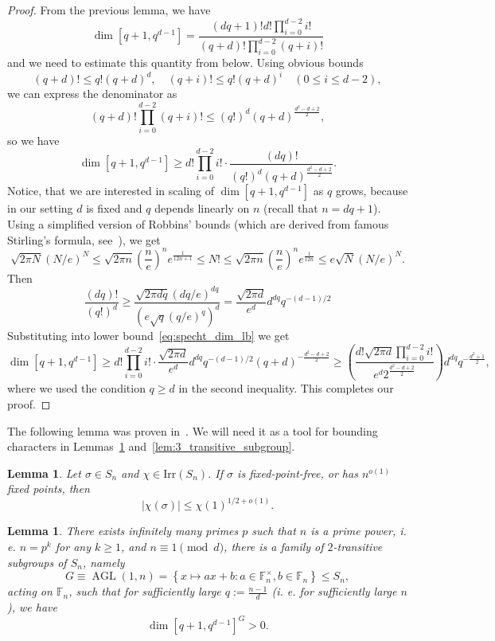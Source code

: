 \documentclass[11pt,letterpaper]{article}
\theoremstyle{plain}
\theoremstyle{plain}
\theoremstyle{plain}
\theoremstyle{plain}
\theoremstyle{plain}
\theoremstyle{plain}
\theoremstyle{plain}
\newtheorem{smlemma}[smtheorem]{Lemma}
\theoremstyle{definition}
\theoremstyle{plain}
\begin{document}
\begin{proof}
    From the previous lemma, we have
\[
    \operatorname{dim} [q+1, q^{d-1}]=\frac{(d q+1)!d!\prod_{i=0}^{d-2} i!}{(q+d)!\prod_{i=0}^{d-2}(q+i)!}
\]
and we need to estimate this quantity from below. Using obvious bounds
\[
    (q+d)!\leq q!(q+d)^d, \quad(q+i)!\leq q!(q+d)^i \quad(0 \leq i \leq d-2),
\]
we can express the denominator as
\[
    (q+d)!\prod_{i=0}^{d-2}(q+i)!\leq(q!)^d(q+d)^{\frac{d^2-d+2}{2}},
\]
so we have
\begin{equation}\label{eq:specht_dim_lb}
    \operatorname{dim} [q+1, q^{d-1}] \geq d!\prod_{i=0}^{d-2} i! \cdot \frac{(dq)!}{(q!)^d(q+d)^{\frac{d^2-d+2}{2}}}.
\end{equation}
Notice, that we are interested in scaling of $\operatorname{dim} [q+1, q^{d-1}]$ as $q$ grows, because in our setting
$d$ is fixed and $q$ depends linearly on $n$ (recall that $n=d q+1$). Using a simplified version of Robbins' bounds 
(which are derived from famous Stirling's formula, see~\cite{Robbins1955}), we get 
\[
   \sqrt{2 \pi N}(N / e)^N \leq \sqrt{2 \pi n}\left(\frac{n}{e}\right)^n e^{\frac{1}{12 n+1}} 
   \leq N!\leq \sqrt{2 \pi n}\left(\frac{n}{e}\right)^n e^{\frac{1}{12 n}} \leq e \sqrt{N}(N / e)^N.
\]
Then
\[
    \frac{(d q)!}{(q!)^d} \geq \frac{\sqrt{2 \pi d q}(d q / e)^{d q}}{\left(e \sqrt{q}(q / e)^q\right)^d}=\frac{\sqrt{2 \pi d}}{e^d} d^{d q} q^{-(d-1) / 2}
\]
Substituting into lower bound~\eqref{eq:specht_dim_lb} we get
\[
    \operatorname{dim} [q+1, q^{d-1}] \geq d!\prod_{i=0}^{d-2} i! \cdot \frac{\sqrt{2 \pi d}}{e^d} d^{d q} q^{-(d-1) / 2}(q+d)^{-\frac{d^2-d+2}{2}} 
    \geq \left(\frac{d!\sqrt{2 \pi d}\prod_{i=0}^{d-2} i!}{e^d 2^{\frac{d^2-d+2}{2}}} \right) d^{d q} q^{-\frac{d^2+1}{2}},
\]
where we used the condition $q\geq d$ in the second inequality. This completes our proof.

\end{proof}

The following lemma was proven in~\cite{LarsenShalev2008}. We will need it as a tool for bounding characters in Lemmas~\ref{lem:2_transitive_subgroup} and~\ref{lem:3_transitive_subgroup}.

\begin{smlemma}\label{lem:character_bound}
    Let $\sigma \in S_n$ and $\chi \in \text{Irr}(S_n)$. If $\sigma$ is fixed-point-free, or has $n^{o(1)}$ fixed points, then
    \[
        |\chi(\sigma)| \leq \chi(1)^{1 / 2+o(1)}.
    \]
\end{smlemma}

\begin{smlemma} \label{lem:2_transitive_subgroup}
    There exists infinitely many primes $p$ such that $n$ is a prime power, i. e. $n=p^k$ for any $k\geq 1$, and $n\equiv 1 \pmod{d}$, there is a family of $2$-transitive subgroups of $S_n$, namely
    \begin{equation}\label{eq:AGL}
        G\equiv\operatorname{AGL}(1, n)=\left\{x \mapsto a x+b: a \in \mathbb{F}_n^{\times}, b \in \mathbb{F}_n\right\}\leq S_n,
    \end{equation}
    acting on $\mathbb{F}_n$, such that for sufficiently large $q:=\frac{n-1}{d}$ (i. e. for sufficiently large $n$), we have 
    \[\dim [q+1, q^{d-1}]^G > 0.\]
\end{smlemma}
\end{document}
